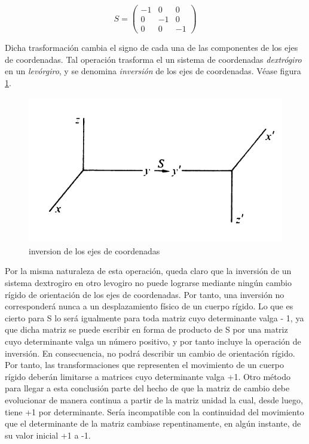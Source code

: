 \documentclass[12pt,a4paper]{book}
\begin{document}
$$ S = \begin{pmatrix}
-1 &
0 & 
0 \\
0 & 
-1 &
0 \\
0 & 
0 & 
-1 
\end{pmatrix} $$

Dicha trasformación cambia el signo de cada una de las componentes de los ejes de coordenadas. Tal operación trasforma el un sistema de coordenadas \textit{dextrógiro} en un \textit{levórgiro}, y se denomina \textit{inversión} de los ejes de coordenadas. Véase figura \ref{Fig:3.1}. \\



\begin{figure}[h!] \centering
\includegraphics[scale=1]{inversionejes.png}
\caption{inversion de los ejes de coordenadas}
\label{Fig:3.1}
\end{figure}

Por la misma naturaleza de esta operación, queda claro que la inversión de un sistema dextrogiro en otro levogiro no puede lograrse mediante ningún cambio rígido de orientación de los ejes de coordenadas. Por tanto, una inversión no corresponderá nunca a un desplazamiento físico de un cuerpo rígido. Lo que es cierto para S lo será igualmente para toda matriz cuyo determinante valga - 1, ya que dicha matriz se puede escribir en forma de producto de S por una matriz cuyo determinante valga un número positivo, y por tanto incluye la operación de inversión. En consecuencia, no podrá describir un cambio de orientación rígido. Por tanto, las transformaciones que representen el movimiento de un cuerpo rígido deberán limitarse a matrices cuyo determinante valga +1. Otro método para llegar a esta conclusión parte del hecho de que la matriz de cambio debe evolucionar de manera continua a partir de la matriz unidad la cual, desde luego, tiene +1 por determinante. Sería incompatible con la continuidad del movimiento que el determinante de la matriz cambiase repentinamente, en algún instante, de su valor inicial +1 a -1. \\
\end{document}
